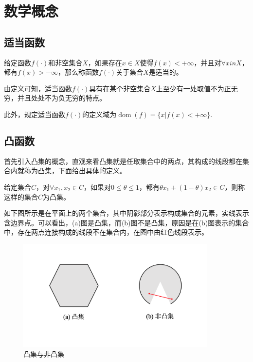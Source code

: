 \section{数学概念}

\subsection{适当函数}
\begin{definition}
    给定函数$f(\cdot)$和非空集合$X$，如果存在$x\in X$使得$f(x)< +\infty$，并且对$\forall x in X$，都有$f(x) > -\infty$，那么称函数$f(\cdot)$关于集合$X$是适当的。\cite{2004Convex}
\end{definition}

由定义可知，适当函数$f(\cdot)$具有在某个非空集合$X$上至少有一处取值不为正无穷，并且处处不为负无穷的特点。

此外，规定适当函数$f(\cdot)$的定义域为$\mathop{\mathrm{dom}} (f) = \{x | f(x) < +\infty\}$.

\subsection{凸函数}
首先引入凸集的概念，直观来看凸集就是任取集合中的两点，其构成的线段都在集合内就称为凸集\cite{2004Convex}，下面给出具体的定义。

\begin{definition}
    给定集合$C$，对$\forall x_{1}, x_{2}\in C$，如果对$0 \leq \theta \leq 1$，都有$\theta x_{1}+(1-\theta)x_{2}\in C$，则称这样的集合$C$为凸集。
\end{definition}

如下图所示是在平面上的两个集合，其中阴影部分表示构成集合的元素，实线表示含边界点。可以看出，(a)图是凸集，而(b)图不是凸集，原因是在(b)图表示的集合中，存在两点连接构成的线段不在集合内，在图中由红色线段表示。

\begin{figure}[hbtp]
    \centering
    \includegraphics[width=100mm]{./Figures/convex_set_figure.png}
    \caption{凸集与非凸集}
    \label{figure_xlnx}
\end{figure}


